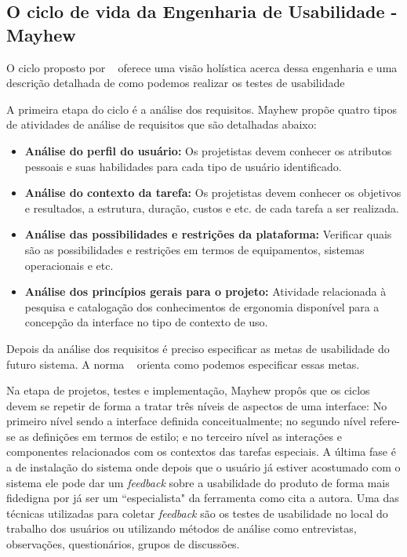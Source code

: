 \subsection{O ciclo de vida da Engenharia de Usabilidade - Mayhew}

	O ciclo proposto por ~ oferece uma visão holística acerca dessa engenharia e uma descrição detalhada de como podemos realizar os testes de usabilidade %

	A primeira etapa do ciclo é a análise dos requisitos. Mayhew propõe quatro tipos de atividades de análise de requisitos que são detalhadas abaixo:

\begin{itemize}
\item \textbf{Análise do perfil do usuário:} Os projetistas devem conhecer os atributos pessoais e suas habilidades para cada tipo de usuário identificado. 
	
\item \textbf{Análise do contexto da tarefa:} Os projetistas devem conhecer os objetivos e resultados, a estrutura, duração, custos e etc. de cada tarefa a ser realizada.

\item \textbf{Análise das possibilidades e restrições da plataforma:} Verificar quais são as possibilidades e restrições em termos de equipamentos, sistemas operacionais e etc.

\item \textbf{Análise dos princípios gerais para o projeto:} Atividade relacionada à pesquisa e catalogação dos conhecimentos de ergonomia disponível para a concepção da interface no tipo de contexto de uso.

\end{itemize}

	Depois da análise dos requisitos é preciso especificar as metas de usabilidade do futuro sistema. A norma ~ orienta como podemos especificar essas metas.

	Na etapa de projetos, testes e implementação, Mayhew propôs que os ciclos devem se repetir de forma a tratar três níveis de aspectos de uma interface: No primeiro nível sendo a interface definida conceitualmente; no segundo nível refere-se as definições em termos de estilo; e no terceiro nível as interações e componentes relacionados com os contextos das tarefas especiais. A última fase é a de instalação do sistema onde depois que o usuário já estiver acostumado com o sistema ele pode dar um \textit{feedback} sobre a usabilidade do produto de forma mais fidedigna por já ser um ``especialista" da ferramenta como cita a autora. 
%
	Uma das técnicas utilizadas para coletar \textit{feedback} são os testes de usabilidade no local do trabalho dos usuários ou utilizando métodos de análise como entrevistas, observações, questionários, grupos de discussões. 


